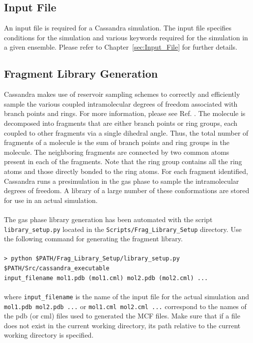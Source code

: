 \subsection{Input File}
%
%
An input file is required for a Cassandra simulation. The input file
specifies conditions for the simulation and various keywords required
for the simulation in a given ensemble. Please refer to 
Chapter~\ref{sec:Input_File}  for further details.
%
\subsection{Fragment Library Generation}
Cassandra makes use of reservoir sampling schemes to correctly and efficiently sample the various coupled intramolecular degrees of freedom associated with
branch points and rings. For more information, please see Ref. \cite{Shah:2011}. 
The molecule is decomposed 
into fragments that are either branch points or ring groups,
each coupled to other fragments via a single dihedral angle. Thus, the
total number of fragments of a molecule is the sum of branch points
and ring groups in the molecule. The neighboring fragments are
connected by two common atoms present in each of the fragments. Note
that the ring group contains all the ring atoms and those directly
bonded to the ring atoms. For each fragment identified, Cassandra runs
a pre\textendash simulation in the gas phase to sample the intramolecular degrees
of freedom. A library of a large number of these conformations are
stored for use in an actual simulation. \\ \\
%
%
The gas phase library generation has been automated with the script \texttt{library\_setup.py} located in the \texttt{Scripts/Frag\_Library\_Setup}
directory. Use the following command for generating the fragment library. \\ \\
%
\texttt{> python \$PATH/Frag\_Library\_Setup/library\_setup.py \$PATH/Src/cassandra\_executable \\ input\_filename mol1.pdb (mol1.cml)  mol2.pdb (mol2.cml) ...}\\ \\
%
where \texttt{input\_filename} is the name of the input file for the actual simulation and \texttt{mol1.pdb mol2.pdb ...} or \texttt{mol1.cml mol2.cml ...} correspond to the
names of the pdb (or cml) files used to generated the MCF files. Make sure that if a file does not exist in the current working directory, its path relative
to the current working directory is specified. 

